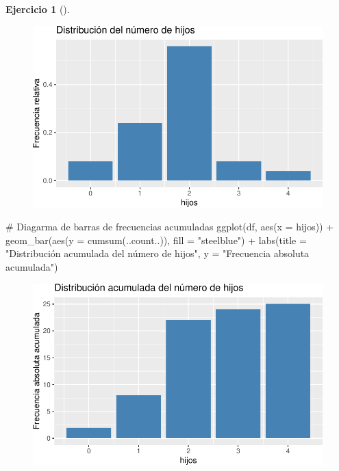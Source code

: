 \documentclass[
  a4paper,
]{scrreport}
\newenvironment{Shaded}{\begin{snugshade}}{\end{snugshade}}
\newcommand{\AttributeTok}[1]{\textcolor[rgb]{0.40,0.45,0.13}{#1}}
\newcommand{\CommentTok}[1]{\textcolor[rgb]{0.37,0.37,0.37}{#1}}
\newcommand{\FunctionTok}[1]{\textcolor[rgb]{0.28,0.35,0.67}{#1}}
\newcommand{\NormalTok}[1]{\textcolor[rgb]{0.00,0.23,0.31}{#1}}
\newcommand{\SpecialCharTok}[1]{\textcolor[rgb]{0.37,0.37,0.37}{#1}}
\newcommand{\StringTok}[1]{\textcolor[rgb]{0.13,0.47,0.30}{#1}}
\theoremstyle{definition}
\newtheorem{exercise}{Ejercicio}[chapter]
\theoremstyle{remark}
\begin{document}
\begin{exercise}[]
\begin{tcolorbox}
\begin{figure}[H]

{\centering \includegraphics{./03-frecuencias-graficos_files/figure-pdf/unnamed-chunk-7-2.pdf}

}

\end{figure}

\begin{Shaded}
\begin{Highlighting}[]
\CommentTok{\# Diagarma de barras de frecuencias acumuladas}
\FunctionTok{ggplot}\NormalTok{(df, }\FunctionTok{aes}\NormalTok{(}\AttributeTok{x =}\NormalTok{ hijos)) }\SpecialCharTok{+}
    \FunctionTok{geom\_bar}\NormalTok{(}\FunctionTok{aes}\NormalTok{(}\AttributeTok{y =} \FunctionTok{cumsum}\NormalTok{(..count..)), }\AttributeTok{fill =} \StringTok{"steelblue"}\NormalTok{) }\SpecialCharTok{+}
    \FunctionTok{labs}\NormalTok{(}\AttributeTok{title =} \StringTok{"Distribución acumulada del número de hijos"}\NormalTok{, }\AttributeTok{y =} \StringTok{"Frecuencia absoluta acumulada"}\NormalTok{)}
\end{Highlighting}
\end{Shaded}

\begin{figure}[H]

{\centering \includegraphics{./03-frecuencias-graficos_files/figure-pdf/unnamed-chunk-7-3.pdf}

}
\end{figure}
\end{tcolorbox}
\end{exercise}
\end{document}
